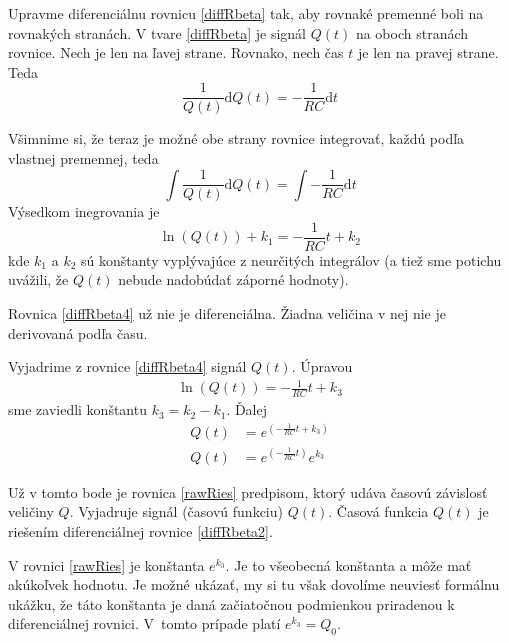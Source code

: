 \documentclass[a4paper, 10pt, ]{article}
\begin{document}
\medskip

Upravme diferenciálnu rovnicu \eqref{diffRbeta} tak, aby rovnaké premenné boli na rovnakých stranách. V tvare \eqref{diffRbeta} je signál $Q(t)$ na oboch stranách rovnice. Nech je len na ľavej strane. Rovnako, nech čas $t$ je len na pravej strane. Teda
\begin{equation} \label{diffRbeta2}
    \frac{1}{Q(t)}\text{d}Q(t) = - \frac{1}{RC} \text{d}t
\end{equation}

Všimnime si, že teraz je možné obe strany rovnice integrovať, každú podľa vlastnej premennej, teda
\begin{equation} \label{diffRbeta3}
    \int \frac{1}{Q(t)}\text{d}Q(t) =  \int - \frac{1}{RC} \text{d}t
\end{equation}
Výsedkom inegrovania je
\begin{equation} \label{diffRbeta4}
     \ln \left(  Q(t)  \right) + k_1 =   - \frac{1}{RC} t + k_2
\end{equation}
kde $k_1$ a $k_2$ sú konštanty vyplývajúce z neurčitých integrálov (a tiež sme potichu uvážili, že $Q(t)$ nebude nadobúdať záporné hodnoty).





Rovnica \eqref{diffRbeta4} už nie je diferenciálna. Žiadna veličina v nej nie je derivovaná podľa času.

Vyjadrime z rovnice \eqref{diffRbeta4} signál $Q(t)$. Úpravou
\begin{align}
    \ln \left(  Q(t)  \right)  =   - \frac{1}{RC} t + k_3
\end{align}
sme zaviedli konštantu $k_3 = k_2 - k_1$. Ďalej
\begin{subequations}
    \begin{align}
        Q(t)   &=  e^{\left( - \frac{1}{RC} t + k_3 \right)} \\
        Q(t)   &=  e^{\left( - \frac{1}{RC} t \right)}  e^{k_3} \label{rawRies}
    \end{align}
\end{subequations}

Už v tomto bode je rovnica \eqref{rawRies} predpisom, ktorý udáva časovú závislosť veličiny $Q$. Vyjadruje signál (časovú funkciu) $Q(t)$. Časová funkcia $Q(t)$ je riešením diferenciálnej rovnice \eqref{diffRbeta2}.

V rovnici \eqref{rawRies} je konštanta $e^{k_3}$. Je to všeobecná konštanta a môže mať akúkoľvek hodnotu. Je možné ukázať, my si tu však dovolíme neuviesť formálnu ukážku, že táto konštanta je daná začiatočnou podmienkou priradenou k diferenciálnej rovnici. V~tomto prípade platí $e^{k_3} = Q_0$.
\end{document}
